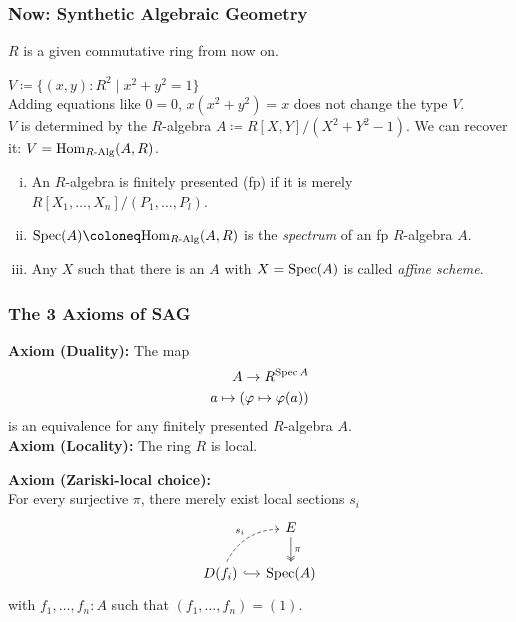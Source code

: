 \documentclass{beamer}
\begin{document}
\begin{frame}
  \frametitle{Now: \textbf{Synthetic} Algebraic Geometry}
  \pause
  $R$ is a given commutative ring from now on. \\
  \vspace{0.4cm}
  \pause

  $V\coloneq \{(x,y):R^2\mid x^2+y^2=1 \}$ \\

  \pause
  Adding equations like $0=0$, $x(x^2+y^2)=x$ does not change the type $V$. \\
  \pause
  $V$ is determined by the $R$-algebra $A\coloneq R[X,Y]/(X^2+Y^2-1)$.
  \pause
  We can recover it: $V=\mathrm{Hom}_{R\text{-}\mathrm{Alg}}(A,R)$. \\
  \vspace{0.4cm}
  \pause
  \begin{definition}
    \begin{enumerate}[(i)]
    \item An $R$-algebra is finitely presented (fp) if it is merely $R[X_1,\dots,X_n]/(P_1,\dots,P_l)$.
    \item $\Spec(A)\coloneq \Hom_{\Alg{R}}(A,R)$ is the \emph{spectrum} of an fp $R$-algebra $A$.
    \item Any $X$ such that there is an $A$ with $X=\operatorname{Spec}(A)$ is called \emph{affine scheme}.
    \end{enumerate}
  \end{definition}
\end{frame}

\begin{frame}
  \frametitle{The 3 Axioms of SAG}
    \textbf{Axiom (Duality):}
    The map
    \begin{align*}
      A \to R^{\operatorname{Spec} A} \\
      a\mapsto (\varphi\mapsto \varphi(a))
    \end{align*}
    is an equivalence
    for any finitely presented $R$-algebra $A$. \\
  \pause
  \vspace{1.5mm}
  \textbf{Axiom (Locality):} The ring $R$ is local.

  \vspace{1.5mm}
  \textbf{Axiom (Zariski-local choice):}\\
  For every surjective $\pi$, there merely exist local sections $s_i$
  \[ \begin{tikzcd}[ampersand replacement=\&, column sep=small]
    \& E \ar[d, two heads, "\pi"] \\
    D(f_i) \ar[r, hook] \ar[ur, bend left, dashed, "s_i"] \& \Spec(A)
  \end{tikzcd} \]
  with $f_1, \dots, f_n : A$ such that $(f_1,\dots,f_n)=(1)$.
\end{frame}
\end{document}
